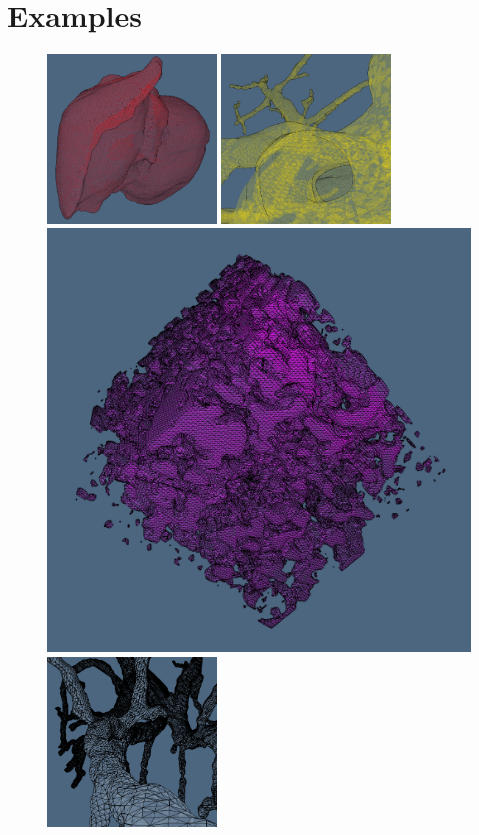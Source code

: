 
\section{Examples}\label{sec:examples}

\begin{figure}
\centering
\includegraphics[width=0.4\textwidth]{figs/liver_01_red_3.png} 
\includegraphics[width=0.4\textwidth]{figs/portalvein_01_yellow_3.png} 
\includegraphics[height=0.4\textwidth]{src/figs/nrn10_100_magenta_high_res.png} 
\includegraphics[width=0.4\textwidth]{figs/porta_smoothing_2.png} 

\end{figure}
